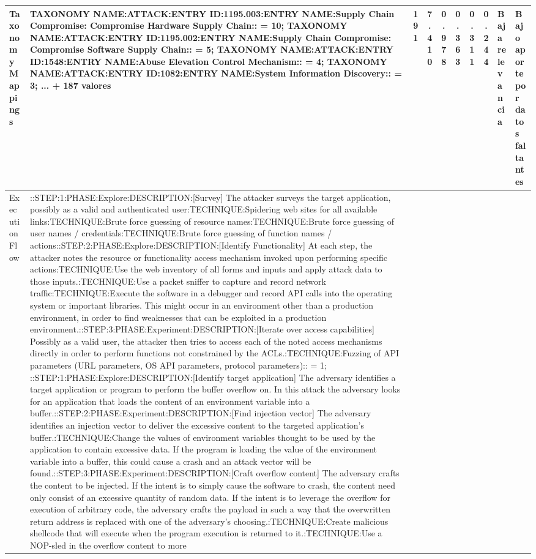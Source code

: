 \begin{table}[h]
\begin{tabular}{|p{2.1cm}|p{3.0cm}|c|c|c|c|c|c|p{2.5cm}|p{2.8cm}|}
\hline
Taxonomy Mappings & TAXONOMY NAME:ATTACK:ENTRY ID:1195.003:ENTRY NAME:Supply Chain Compromise: Compromise Hardware Supply Chain:: = 10; TAXONOMY NAME:ATTACK:ENTRY ID:1195.002:ENTRY NAME:Supply Chain Compromise: Compromise Software Supply Chain:: = 5; TAXONOMY NAME:ATTACK:ENTRY ID:1548:ENTRY NAME:Abuse Elevation Control Mechanism:: = 4; TAXONOMY NAME:ATTACK:ENTRY ID:1082:ENTRY NAME:System Information Discovery:: = 3; ... + 187 valores & 191 & 7.410 & 0.978 & 0.363 & 0.311 & 0.244 & Baja relevancia & Bajo aporte por datos faltantes \\
\hline
Execution Flow & ::STEP:1:PHASE:Explore:DESCRIPTION:[Survey] The attacker surveys the target application, possibly as a valid and authenticated user:TECHNIQUE:Spidering web sites for all available links:TECHNIQUE:Brute force guessing of resource names:TECHNIQUE:Brute force guessing of user names / credentials:TECHNIQUE:Brute force guessing of function names / actions::STEP:2:PHASE:Explore:DESCRIPTION:[Identify Functionality] At each step, the attacker notes the resource or functionality access mechanism invoked upon performing specific actions:TECHNIQUE:Use the web inventory of all forms and inputs and apply attack data to those inputs.:TECHNIQUE:Use a packet sniffer to capture and record network traffic:TECHNIQUE:Execute the software in a debugger and record API calls into the operating system or important libraries. This might occur in an environment other than a production environment, in order to find weaknesses that can be exploited in a production environment.::STEP:3:PHASE:Experiment:DESCRIPTION:[Iterate over access capabilities] Possibly as a valid user, the attacker then tries to access each of the noted access mechanisms directly in order to perform functions not constrained by the ACLs.:TECHNIQUE:Fuzzing of API parameters (URL parameters, OS API parameters, protocol parameters):: = 1; ::STEP:1:PHASE:Explore:DESCRIPTION:[Identify target application] The adversary identifies a target application or program to perform the buffer overflow on. In this attack the adversary looks for an application that loads the content of an environment variable into a buffer.::STEP:2:PHASE:Experiment:DESCRIPTION:[Find injection vector] The adversary identifies an injection vector to deliver the excessive content to the targeted application's buffer.:TECHNIQUE:Change the values of environment variables thought to be used by the application to contain excessive data. If the program is loading the value of the environment variable into a buffer, this could cause a crash and an attack vector will be found.::STEP:3:PHASE:Experiment:DESCRIPTION:[Craft overflow content] The adversary crafts the content to be injected. If the intent is to simply cause the software to crash, the content need only consist of an excessive quantity of random data. If the intent is to leverage the overflow for execution of arbitrary code, the adversary crafts the payload in such a way that the overwritten return address is replaced with one of the adversary's choosing.:TECHNIQUE:Create malicious shellcode that will execute when the program execution is returned to it.:TECHNIQUE:Use a NOP-sled in the overflow content to more 
\end{tabular}
\end{table}
